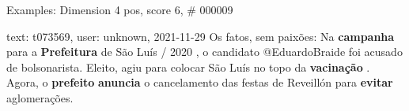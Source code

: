 \begin{frame}{Examples: Dimension 4 pos, score 6, \# 000009}
\footnotesize
\begin{exampleblock}{text: t073569, user: unknown, 2021-11-29}
Os fatos, sem paixões: Na \textbf{campanha} para a \textbf{Prefeitura} de São 
Luís / 2020 , o candidato @EduardoBraide foi acusado de bolsonarista. Eleito, 
agiu para colocar São Luís no topo da \textbf{vacinação} . Agora, o 
\textbf{prefeito} \textbf{anuncia} o cancelamento das festas de Reveillón para 
\textbf{evitar} aglomerações. 
\end{exampleblock}
\end{frame}

